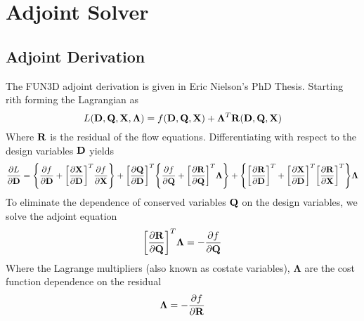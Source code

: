 \chapter{Adjoint Solver}
\label{chapter-two}

\section{Adjoint Derivation}

The FUN3D adjoint derivation is given in Eric Nielson's PhD Thesis.  Starting
rith forming the Lagrangian as
\begin{equation}
  L(\mathbf D,\mathbf Q,\mathbf X,\mathbf{\Lambda})=f(\mathbf D,\mathbf Q,\mathbf X)
  +\mathbf{\Lambda}^T\mathbf R(\mathbf D,\mathbf Q,\mathbf X)
\end{equation}
Where $\mathbf R$ is the residual of the flow equations.  Differentiating with respect
to the design variables $\mathbf D$ yields
\begin{equation}
  \frac{\partial L}{\partial \mathbf D}=
  \Bigg\{\frac{\partial f}{\partial \mathbf D}+\bigg[\frac{\partial \mathbf X}{\partial \mathbf D}\bigg]^T \frac{\partial f}{\partial \mathbf X}\Bigg\}
  +\bigg[\frac{\partial \mathbf Q}{\partial \mathbf D}\bigg]^T
  \Bigg\{\frac{\partial f}{\partial \mathbf Q}+\bigg[\frac{\partial \mathbf R}{\partial \mathbf Q}\bigg]^T \mathbf{\Lambda}\Bigg\}
  +\Bigg\{\bigg[\frac{\partial \mathbf R}{\partial \mathbf D}\bigg]^T
  +\bigg[\frac{\partial \mathbf X}{\partial \mathbf D}\bigg]^T\bigg[\frac{\partial \mathbf R}{\partial \mathbf X}\bigg]^T\Bigg\}\mathbf{\Lambda}
  \label{dL}
\end{equation}
To eliminate the dependence of conserved variables $\mathbf Q$ on the design
variables, we solve the adjoint equation
\begin{equation}
  \bigg[\frac{\partial \mathbf R}{\partial \mathbf Q}\bigg]^T\mathbf{\Lambda}=
  -\frac{\partial f}{\partial \mathbf Q}
  \label{adjoint-main}
\end{equation}
Where the Lagrange multipliers (also known as costate variables),
$\mathbf{\Lambda}$ are the cost function dependence on the residual
\begin{equation}
  \mathbf{\Lambda}=-\frac{\partial f}{\partial \mathbf R}
\end{equation}
